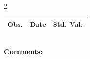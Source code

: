 
\bigskip 
\begin{multicols}{2}{ 
\begin{tabular}{ccc}
\hline  Obs.  &  Date &  Std. Val. \\ 
\hline 
 \end{tabular} 
\\ 
 \columnbreak 
 \singlespacing 
 \underline{\textbf{Comments:}} \\ 
 \bigskip       

 } 
\end{multicols} 
